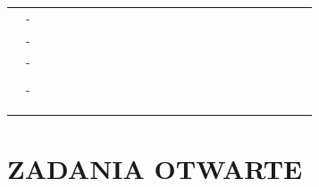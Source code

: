 \documentclass[10pt]{article}
\begin{document}
\begin{center}
\begin{tabular}{|c|c|c|c|c|c|c|c|c|c|c|c|c|c|c|c|c|c|c|c|c|c|c|c|}
 &  &  &  &  &  &  &  &  &  &  &  &  &  &  &  &  &  &  &  &  &  \\
\hline
 & - &  &  &  &  &  &  &  &  &  &  &  &  &  &  &  &  &  &  &  &  &  &  \\
\hline
 & - &  &  &  &  &  &  &  &  &  &  &  &  &  &  &  &  &  &  &  &  &  &  \\
\hline
 & - &  &  &  &  &  &  &  &  &  &  &  &  &  &  &  &  &  &  &  &  &  &  \\
\hline
 &  &  &  &  &  &  &  &  &  &  &  &  &  &  &  &  &  &  &  &  &  &  &  \\
\hline
 & - &  &  &  &  &  &  &  &  &  &  &  &  &  &  &  &  &  &  &  &  &  &  \\
\hline
 &  &  &  &  &  &  &  &  &  &  &  &  &  &  &  &  &  &  &  &  &  &  &  \\
\hline
 &  &  &  &  &  &  &  &  &  &  &  &  &  &  &  &  &  &  &  &  &  &  &  \\
\hline
 &  &  &  &  &  &  &  &  &  &  &  &  &  &  &  &  &  &  &  &  &  &  &  \\
\hline
\end{tabular}
\end{center}

\section*{ZADANIA OTWARTE}
\end{document}
